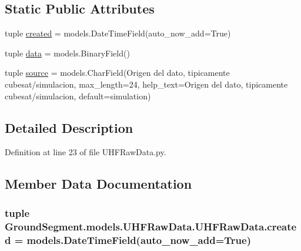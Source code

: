 \subsection*{Static Public Attributes}
\begin{DoxyCompactItemize}
\item 
tuple \hyperlink{class_ground_segment_1_1models_1_1_u_h_f_raw_data_1_1_u_h_f_raw_data_ac9fc4f0ad0f0b8e8f4b45b54fbdd93d4}{created} = models.\+Date\+Time\+Field(auto\+\_\+now\+\_\+add=True)
\item 
tuple \hyperlink{class_ground_segment_1_1models_1_1_u_h_f_raw_data_1_1_u_h_f_raw_data_a617ee1b3a10bfb1dbdad7f5e58ecd111}{data} = models.\+Binary\+Field()
\item 
tuple \hyperlink{class_ground_segment_1_1models_1_1_u_h_f_raw_data_1_1_u_h_f_raw_data_af793b6af185be9c8f4895d2600959b3e}{source} = models.\+Char\+Field(\textquotesingle{}Origen del dato, tipicamente cubesat/simulacion\textquotesingle{}, max\+\_\+length=24, help\+\_\+text=\textquotesingle{}Origen del dato, tipicamente cubesat/simulacion\textquotesingle{}, default=\textquotesingle{}simulation\textquotesingle{})
\end{DoxyCompactItemize}


\subsection{Detailed Description}


Definition at line 23 of file U\+H\+F\+Raw\+Data.\+py.



\subsection{Member Data Documentation}
\hypertarget{class_ground_segment_1_1models_1_1_u_h_f_raw_data_1_1_u_h_f_raw_data_ac9fc4f0ad0f0b8e8f4b45b54fbdd93d4}{}
\subsubsection[{created}]{\setlength{\rightskip}{0pt plus 5cm}tuple Ground\+Segment.\+models.\+U\+H\+F\+Raw\+Data.\+U\+H\+F\+Raw\+Data.\+created = models.\+Date\+Time\+Field(auto\+\_\+now\+\_\+add=True)\hspace{0.3cm}{\ttfamily [static]}}\label{class_ground_segment_1_1models_1_1_u_h_f_raw_data_1_1_u_h_f_raw_data_ac9fc4f0ad0f0b8e8f4b45b54fbdd93d4}


